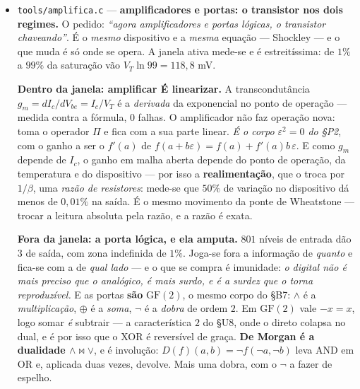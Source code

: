 \documentclass[11pt]{article}
\newcommand{\code}[1]{\texttt{\small #1}}
\theoremstyle{plain}
\theoremstyle{remark}
\begin{document}
\begin{itemize}
E a densa é o \emph{caso degenerado}: com $E=1$ e $g=1$, os dois dão o mesmo com diferença
$0{,}000\mathrm{e}{+}00$. Mais: para gates \emph{fixos} o MoE é exatamente uma densa,
$W=\sum_e g_e W_e$ ($8{,}9\times10^{-16}$). \emph{A diferença real não é de topologia:} é que os
gates \textbf{não são fixos} --- dependem da entrada, pelo roteador --- logo o MoE é uma densa cuja
matriz muda com $x$, e é isso que o torna multiplicativo em vez de aditivo.

\emph{A anterior frase estava errada.} O que o forward não sabe fazer não é uma rede diferente: é o
\textbf{roteador}, que são vinte linhas.

\item \code{tools/amplifica.c} --- \textbf{amplificadores e portas: o transistor nos dois
regimes.} O pedido: \emph{``agora amplificadores e portas lógicas, o transistor chaveando''}. É o
\emph{mesmo} dispositivo e a \emph{mesma} equação --- Shockley --- e o que muda é só onde se opera.
A janela ativa mede-se e é estreitíssima: de $1\%$ a $99\%$ da saturação vão $V_T\ln 99=118{,}8$ mV.

\textbf{Dentro da janela: amplificar É linearizar.} A transcondutância $g_m=dI_c/dV_{be}=I_c/V_T$
é a \emph{derivada} da exponencial no ponto de operação --- medida contra a fórmula, $0$ falhas. O
amplificador não faz operação nova: toma o operador $\Pi$ e fica com a sua parte linear. \emph{É o
corpo $\varepsilon^2=0$ do §P2}, com o ganho a ser o $f'(a)$ de $f(a+b\varepsilon)=f(a)+f'(a)b\,
\varepsilon$. E como $g_m$ depende de $I_c$, o ganho em malha aberta depende do ponto de operação,
da temperatura e do dispositivo --- por isso a \textbf{realimentação}, que o troca por
$1/\beta$, uma \emph{razão de resistores}: mede-se que $50\%$ de variação no dispositivo dá menos de
$0{,}01\%$ na saída. É o mesmo movimento da ponte de Wheatstone --- trocar a leitura absoluta pela
razão, e a razão é exata.

\textbf{Fora da janela: a porta lógica, e ela amputa.} $801$ níveis de entrada dão $3$ de saída, com
zona indefinida de $1\%$. Joga-se fora a informação de \emph{quanto} e fica-se com a de \emph{qual
lado} --- e o que se compra é imunidade: \emph{o digital não é mais preciso que o analógico, é mais
surdo, e é a surdez que o torna reproduzível.} E as portas \textbf{são} $\mathrm{GF}(2)$, o mesmo
corpo do §B7: $\wedge$ é a \emph{multiplicação}, $\oplus$ é a \emph{soma}, $\neg$ é a \emph{dobra}
de ordem $2$. Em $\mathrm{GF}(2)$ vale $-x=x$, logo somar \emph{é} subtrair --- a característica $2$
do §U8, onde o direto colapsa no dual, e é por isso que o XOR é reversível de graça. \textbf{De
Morgan é a dualidade $\wedge\bowtie\vee$}, e é involução: $D(f)(a,b)=\neg f(\neg a,\neg b)$ leva AND
em OR e, aplicada duas vezes, devolve. Mais uma dobra, com o $\neg$ a fazer de espelho.


\end{itemize}
\end{document}
